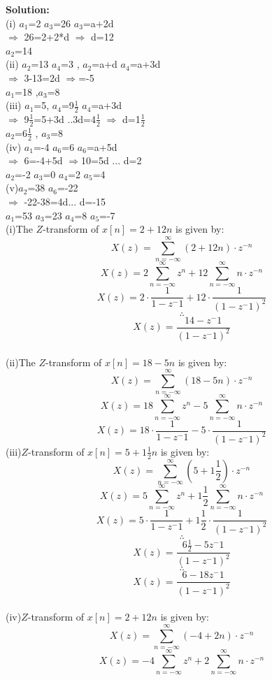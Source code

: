 \documentclass[journal,12pt,twocolumn]{IEEEtran}
\theoremstyle{remark}
\begin{document}
\textbf{Solution:}\\

(i) $a_1$=2 $a_3$=26 $a_3$=a+2d\\
$\Longrightarrow$ 26=2+2*d $\Longrightarrow$ d=12\\
$a_2$=14\\
(ii) $a_2$=13 $a_4$=3 , $a_2$=a+d $a_4$=a+3d \\
$\Longrightarrow$ 3-13=2d $\Longrightarrow$=-5\\ $a_1$=18 ,$a_3$=8\\
(iii) $a_1$=5, $a_4$=9\(\frac{1}{2}\) $a_4$=a+3d\\
$\Longrightarrow$ 9\(\frac{1}{2}\)=5+3d ..3d=4\(\frac{1}{2}\) $\Longrightarrow$ d=1\(\frac{1}{2}\)\\
$a_2$=6\(\frac{1}{2}\) , $a_3$=8\\
(iv) $a_1$=-4 $a_6$=6 $a_6$=a+5d\\
$\Longrightarrow$ 6=-4+5d $\Longrightarrow$10=5d ... d=2\\
$a_2$=-2 $a_3$=0 $a_4$=2 $a_5$=4\\
(v)$a_2$=38 $a_6$=-22 \\
$\Longrightarrow$ -22-38=4d... d=-15\\
$a_1$=53 $a_3$=23 $a_4$=8 $a_5$=-7\\
(i)The $Z$-transform of $x[n] = 2 + 12n$ is given by:
\[ X(z) = \sum_{n=-\infty}^{\infty} (2 + 12n) \cdot z^{-n} \]
\[X(z)=2 \sum_{n=-\infty}^{\infty}z^{n}+12 \sum_{n=-\infty}^{\infty} n\cdot z^{-n}\]
\[X(z)=2 \cdot \frac{1}{1-{z^-1}}+ 12 \cdot \frac{1}{(1-{z^-1})^2}\]
$$\therefore$$ \[X(z)=\frac{14-{z^-1}}{(1-{z^-1})^2}\] \\
(ii)The $Z$-transform of $x[n] = 18 - 5n$ is given by:
\[ X(z) = \sum_{n=-\infty}^{\infty} (18 - 5n) \cdot z^{-n} \]
\[X(z)=18 \sum_{n=-\infty}^{\infty}z^{n} - 5\sum_{n=-\infty}^{\infty} n\cdot z^{-n}\]
\[X(z)=18 \cdot \frac{1}{1-{z^-1}} - 5 \cdot \frac{1}{(1-{z^-1})^2}\]
(iii)$Z$-transform of $x[n] = 5 + 1\frac{1}{2}n$ is given by:
\[ X(z) = \sum_{n=-\infty}^{\infty} (5+1\frac{1}{2}) \cdot z^{-n} \]
\[X(z)=5 \sum_{n=-\infty}^{\infty}z^{n}+1\frac{1}{2} \sum_{n=-\infty}^{\infty} n\cdot z^{-n}\]
\[X(z)=5 \cdot \frac{1}{1-{z^-1}}+ 1\frac{1}{2}\cdot \frac{1}{(1-{z^-1})^2}\]
$$\therefore$$ \[X(z)=\frac{6\frac{1}{2}-5{z^-1}}{(1-{z^-1})^2}\]
$$\therefore$$ \[X(z)=\frac{6-18{z^-1}}{(1-{z^-1})^2}\]\\
(iv)$Z$-transform of $x[n] = 2 + 12n$ is given by:
\[ X(z) = \sum_{n=-\infty}^{\infty} (-4 + 2n) \cdot z^{-n} \]
\[X(z)=-4 \sum_{n=-\infty}^{\infty}z^{n}+2 \sum_{n=-\infty}^{\infty} n\cdot z^{-n}\]
\end{document}

